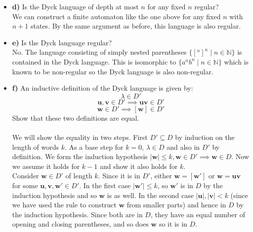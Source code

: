 \documentclass[defaultpackages]{simplereport}
\newcommand{\N}{\mathbb{N}}
\begin{document}
\begin{itemize}[label=]
\item \textbf{d)} Is the Dyck language of depth at most $n$ for any fixed $n$
  regular?\\
  We can construct a finite automaton like the one above for any fixed $n$ with
  $n+1$ states. By the same argument as before, this language is also regular.

\item \textbf{e)} Is the Dyck language regular?\\
  No. The language consisting of simply nested parentheses $\{[^n]^n \mid n \in \N\}$ is contained in
  the Dyck language. This is isomorphic to $\{a^nb^n \mid n \in \N\}$ which is
  known to be non-regular so the Dyck language is also non-regular.

\item \textbf{f)} An inductive definition of the Dyck language is given by:
  \[\lambda \in D'\]
  \[\mathbf{u}, \mathbf{v} \in D' \implies \mathbf{uv} \in D'\]
  \[\mathbf{w} \in D' \implies [\mathbf{w}] \in D'\]
  Show that these two definitions are equal.\\\\

  We will show the equality in two steps. First $D' \subseteq D$ by induction on
  the length of words $k$. As a base step for $k=0$, $\lambda \in D$ and also in
  $D'$ by definition. We form the induction hypothesis $\lvert \mathbf{w} \rvert
  \leq k,  \mathbf{w} \in D' \implies \mathbf{w} \in D$. Now we assume it holds for $k-1$ and
  show it also holds for $k$.\\
  Consider $\mathbf{w} \in D'$ of length $k$. Since it is in $D'$, either
  $\mathbf{w} = [\mathbf{w'}]$ or $\mathbf{w} = \mathbf{uv}$ for some
  $\mathbf{u,v, w'} \in D'$. In the first case $\lvert \mathbf{w'} \rvert \leq
  k$, so $\mathbf{w'}$ is in $D$ by the induction hypothesis and so $\mathbf{w}$
  is as well. In the second case $\lvert \mathbf{u} \rvert, \lvert \mathbf{v}
  \rvert < k$ (since we have used the rule to construct $\mathbf{w}$ from
  smaller parts) and hence in $D$ by the induction hypothesis. Since both are in
  $D$, they have an equal number of opening and closing parentheses, and so does
  $\mathbf{w}$ so it is in $D$.\\\\


\end{itemize}
\end{document}

